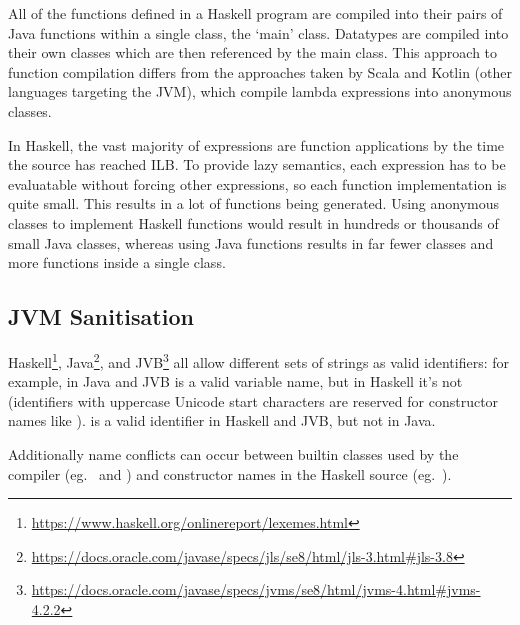 \documentclass[dissertation.tex]{subfiles}
\begin{document}
{{{\begin{enumerate}
{\begin{itemize}
{                }
                \end{itemize}
            }
            \end{enumerate}

            All of the functions defined in a Haskell program are compiled into their pairs of Java functions within
            a single class, the `main' class. Datatypes are compiled into their own classes which are then
            referenced by the main class. This approach to function compilation differs from the approaches taken by
            Scala and Kotlin (other languages targeting the JVM), which compile lambda expressions into anonymous
            classes.

            In Haskell, the vast majority of expressions are function applications by the time the source has
            reached ILB. To provide lazy semantics, each expression has to be evaluatable without forcing other
            expressions, so each function implementation is quite small. This results in a lot of functions being
            generated. Using anonymous classes to implement Haskell functions would result in hundreds or thousands
            of small Java classes, whereas using Java functions results in far fewer classes and more functions
            inside a single class.

        }
    }
    \subsection{JVM Sanitisation}\label{sec:jvm-sanitisation}
    {

        Haskell\footnote{\url{https://www.haskell.org/onlinereport/lexemes.html}},
        Java\footnote{\url{https://docs.oracle.com/javase/specs/jls/se8/html/jls-3.html\#jls-3.8}}, and
        JVB\footnote{\url{https://docs.oracle.com/javase/specs/jvms/se8/html/jvms-4.html\#jvms-4.2.2}} all allow
        different sets of strings as valid identifiers: for example, in Java and JVB  is a valid variable
        name, but in Haskell it's not (identifiers with uppercase Unicode start characters are reserved for
        constructor names like ). \monospace{(+)} is a valid identifier in Haskell and JVB, but not in
        Java.

        Additionally name conflicts can occur between builtin classes used by the compiler (eg.\  and
        ) and constructor names in the Haskell source (eg.\ ).

}}
\end{document}
